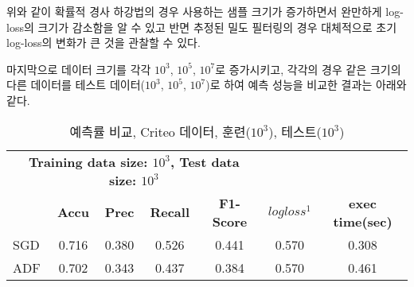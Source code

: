 \documentclass[oneside,b5paper,11pt]{book}
\theoremstyle{plain}
\theoremstyle{definition}
\theoremstyle{remark}
\theoremstyle{definition}
\numberwithin{equation}{chapter}
\begin{document}
위와 같이 확률적 경사 하강법의 경우 사용하는 샘플 크기가 증가하면서 완만하게 log-loss의 크기가 감소함을 알 수 있고 반면 추정된 밀도 필터링의 경우 대체적으로 초기 log-loss의 변화가 큰 것을 관찰할 수 있다.

 마지막으로 데이터 크기를 각각 $10^3$, $10^5$, $10^7$로 증가시키고, 각각의 경우 같은 크기의 다른 데이터를 테스트 데이터($10^3$, $10^5$, $10^7$)로 하여 예측 성능을 비교한 결과는 아래와 같다.



\begin{table}
{\footnotesize
	\begin{center}%
	\begin{tabular}{ccccccc}
	\hline\hline %

    \multicolumn{5}{c}{\textbf{Training data size: $10^3$, Test data size: $10^3$}} & \textbf{} & \textbf{} \\

	\textbf{} & \textbf{Accu} & \textbf{Prec} & \textbf{Recall} & \textbf{F1-Score} & \textbf{$logloss^1$} & \textbf{exec time(sec)} \\

	\hline %
	
	\multicolumn {1}{l|}{SGD} & 0.716 & 0.380 & 0.526 & 0.441 & 0.570 & 0.308 \\ \hline
	\multicolumn {1}{l|}{ADF} & 0.702 & 0.343 & 0.437 & 0.384 & 0.570 & 0.461 \\ \hline

	\hline %

	\end{tabular}
    \end{center}
    \caption[예측률 비교, Criteo 데이터($10^3$)]{예측률 비교, Criteo 데이터, 훈련($10^3$), 테스트($10^3$)}
}
\end{table}

\end{document}
